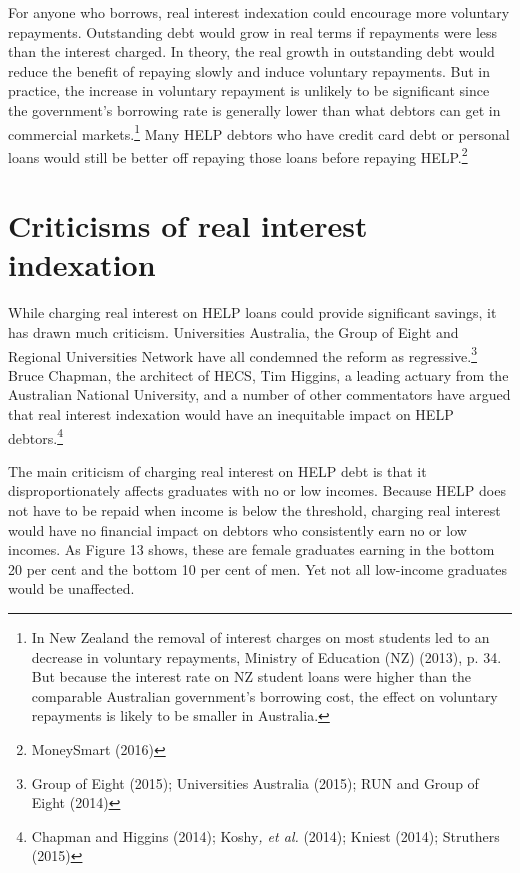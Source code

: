 \documentclass[embargoed]{grattan}
\begin{document}
For anyone who borrows, real interest indexation could encourage more voluntary repayments. Outstanding debt would grow in real terms if repayments were less than the interest charged. In theory, the real growth in outstanding debt would reduce the benefit of repaying slowly and induce voluntary repayments. But in practice, the increase in voluntary repayment is unlikely to be significant since the government's borrowing rate is generally lower than what debtors can get in commercial markets.\footnote{In New Zealand the removal of interest charges on most students led to an decrease in voluntary repayments, Ministry of Education (NZ) (2013), p. 34. But because the interest rate on NZ student loans were higher than the comparable Australian government's borrowing cost, the effect on voluntary repayments is likely to be smaller in Australia.} Many HELP debtors who have credit card debt or personal loans would still be better off repaying those loans before repaying HELP.\footnote{MoneySmart (2016)}

\section{\texorpdfstring{\protect\hypertarget{_Ref438047461}{}{\protect\hypertarget{_Ref333580055}{}{}}Criticisms of real interest indexation}{Criticisms of real interest indexation}}\label{criticisms-of-real-interest-indexation}

While charging real interest on HELP loans could provide significant savings, it has drawn much criticism. Universities Australia, the Group of Eight and Regional Universities Network have all condemned the reform as regressive.\footnote{Group of Eight (2015); Universities Australia (2015); RUN and Group of Eight (2014)} Bruce Chapman, the architect of HECS, Tim Higgins, a leading actuary from the Australian National University, and a number of other commentators have argued that real interest indexation would have an inequitable impact on HELP debtors.\footnote{Chapman and Higgins (2014); Koshy\emph{, et al.} (2014); Kniest (2014); Struthers (2015)}

The main criticism of charging real interest on HELP debt is that it disproportionately affects graduates with no or low incomes. Because HELP does not have to be repaid when income is below the threshold, charging real interest would have no financial impact on debtors who consistently earn no or low incomes. As Figure 13 shows, these are female graduates earning in the bottom 20 per cent and the bottom 10 per cent of men. Yet not all low-income graduates would be unaffected.
\end{document}
